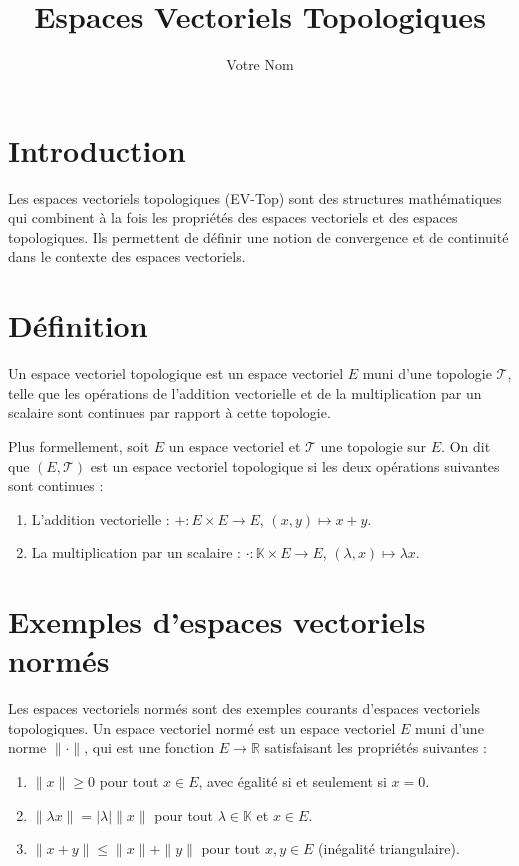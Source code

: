 \documentclass{article}
\title{Espaces Vectoriels Topologiques}
\author{Votre Nom}
\begin{document}
\maketitle

\section{Introduction}

Les espaces vectoriels topologiques (EV-Top) sont des structures mathématiques qui combinent à la fois les propriétés des espaces vectoriels et des espaces topologiques. Ils permettent de définir une notion de convergence et de continuité dans le contexte des espaces vectoriels.

\section{Définition}

Un espace vectoriel topologique est un espace vectoriel $E$ muni d'une topologie $\mathcal{T}$, telle que les opérations de l'addition vectorielle et de la multiplication par un scalaire sont continues par rapport à cette topologie.

Plus formellement, soit $E$ un espace vectoriel et $\mathcal{T}$ une topologie sur $E$. On dit que $(E, \mathcal{T})$ est un espace vectoriel topologique si les deux opérations suivantes sont continues :

\begin{enumerate}
    \item L'addition vectorielle : $+: E \times E \rightarrow E$, $(x, y) \mapsto x + y$.
    \item La multiplication par un scalaire : $\cdot: \mathbb{K} \times E \rightarrow E$, $(\lambda, x) \mapsto \lambda x$.
\end{enumerate}

\section{Exemples d'espaces vectoriels normés}

Les espaces vectoriels normés sont des exemples courants d'espaces vectoriels topologiques. Un espace vectoriel normé est un espace vectoriel $E$ muni d'une norme $\|\cdot\|$, qui est une fonction $E \rightarrow \mathbb{R}$ satisfaisant les propriétés suivantes :

\begin{enumerate}
    \item $\|x\| \geq 0$ pour tout $x \in E$, avec égalité si et seulement si $x = 0$.
    \item $\|\lambda x\| = |\lambda| \|x\|$ pour tout $\lambda \in \mathbb{K}$ et $x \in E$.
    \item $\|x + y\| \leq \|x\| + \|y\|$ pour tout $x, y \in E$ (inégalité triangulaire).
\end{enumerate}
\end{document}
